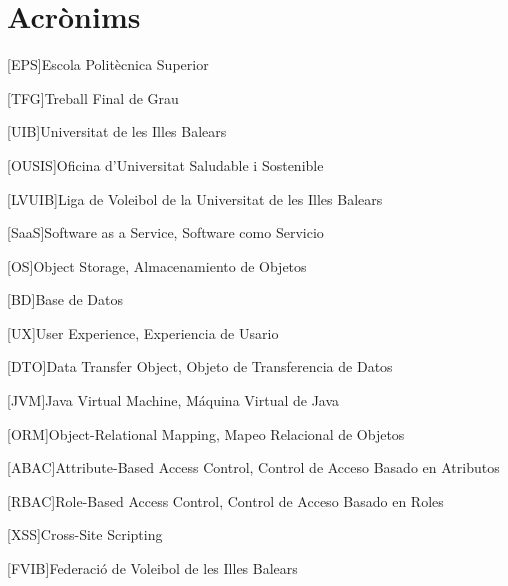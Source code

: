 
\chapter{Acrònims} %
%
%
\begin{acronym}

[EPS]{Escola Politècnica Superior}

[TFG]{Treball Final de Grau}


[UIB]{Universitat de les Illes Balears}

[OUSIS]{Oficina d'Universitat Saludable i Sostenible}

[LVUIB]{Liga de Voleibol de la Universitat de les Illes Balears}

[SaaS]{Software as a Service, Software como Servicio}

[OS]{Object Storage, Almacenamiento de Objetos}

[BD]{Base de Datos}

[UX]{User Experience, Experiencia de Usario}

[DTO]{Data Transfer Object, Objeto de Transferencia de Datos}

[JVM]{Java Virtual Machine, Máquina Virtual de Java}

[ORM]{Object-Relational Mapping, Mapeo Relacional de Objetos}

[ABAC]{Attribute-Based Access Control, Control de Acceso Basado en Atributos}

[RBAC]{Role-Based Access Control, Control de Acceso Basado en Roles}

[XSS]{Cross-Site Scripting}

[FVIB]{Federació de Voleibol de les Illes Balears}







\end{acronym}
